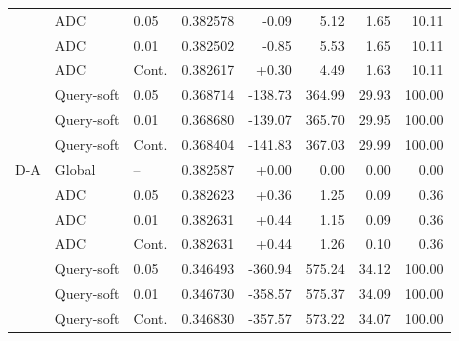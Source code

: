 \begin{table}[htbp]
\begin{tabular}{lllrrrrr}
 & ADC & 0.05 & 0.382578 & -0.09 & 5.12 & 1.65 & 10.11\\
 & ADC & 0.01 & 0.382502 & -0.85 & 5.53 & 1.65 & 10.11\\
 & ADC & Cont. & 0.382617 & +0.30 & 4.49 & 1.63 & 10.11\\
 & Query-soft & 0.05 & 0.368714 & -138.73 & 364.99 & 29.93 & 100.00\\
 & Query-soft & 0.01 & 0.368680 & -139.07 & 365.70 & 29.95 & 100.00\\
 & Query-soft & Cont. & 0.368404 & -141.83 & 367.03 & 29.99 & 100.00\\
\midrule
D-A & Global & -- & 0.382587 & +0.00 & 0.00 & 0.00 & 0.00\\
 & ADC & 0.05 & 0.382623 & +0.36 & 1.25 & 0.09 & 0.36\\
 & ADC & 0.01 & 0.382631 & +0.44 & 1.15 & 0.09 & 0.36\\
 & ADC & Cont. & 0.382631 & +0.44 & 1.26 & 0.10 & 0.36\\
 & Query-soft & 0.05 & 0.346493 & -360.94 & 575.24 & 34.12 & 100.00\\
 & Query-soft & 0.01 & 0.346730 & -358.57 & 575.37 & 34.09 & 100.00\\
 & Query-soft & Cont. & 0.346830 & -357.57 & 573.22 & 34.07 & 100.00\\
\bottomrule
\end{tabular}
\end{table}
